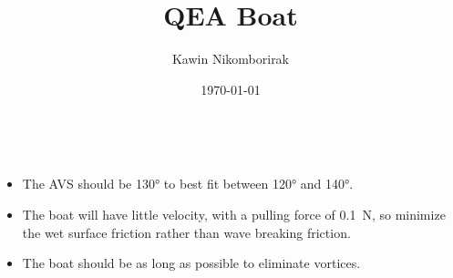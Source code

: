 \documentclass[20pt, a2paper, landscape]{tikzposter}
\title{QEA Boat}
\author{Kawin Nikomborirak}
\date{\today}
\begin{document}
\maketitle

\begin{columns}

  {
    \begin{itemize}
    \item The AVS should be \ang{130} to best fit between \ang{120} and \ang{140}.
    \item The boat will have little velocity, with a pulling force of \SI{.1}{\N}, so minimize the wet surface friction rather than wave breaking friction.
    \item The boat should be as long as possible to eliminate vortices.
    \end{itemize}
  }


\end{columns}
\end{document}
